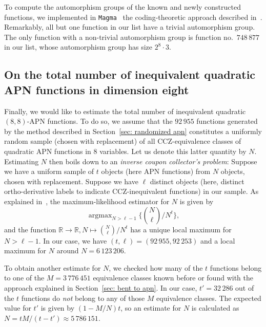 \documentclass{amsart}[11pt]
\theoremstyle{plain}
\theoremstyle{definition}
\numberwithin{theorem}{section}
\numberwithin{equation}{section}
\numberwithin{table}{section}
\numberwithin{figure}{section}
\numberwithin{algorithm}{section}
\DeclareMathOperator*{\argmax}{argmax}
\begin{document}
To compute the automorphism groups of the known and newly constructed functions, we implemented in \texttt{Magma}~\cite{MAGMA:1997} the coding-theoretic approach described in~\cite{EdelP09Equivalence}. Remarkably, all but one function in our list have a trivial automorphism group. The only function with a non-trivial automorphism group is function no.~$748\,877$ in our list, whose automorphism group has size $2^8 \cdot 3$.

\subsection{On the total number of inequivalent quadratic APN functions in dimension eight}\label{sec:total_number}
Finally, we would like to estimate the total number of inequivalent quadratic $(8,8)$-APN functions. To do so, we assume that the $92\,955$ functions generated by the method described in Section~\ref{sec: randomized apn} constitutes a uniformly random sample (chosen with replacement) of all CCZ-equivalence classes of quadratic APN functions in 8 variables. Let us denote this latter quantity by $N$. Estimating $N$ then boils down to an \emph{inverse coupon collector's problem}: Suppose we have a uniform sample of $t$ objects (here APN functions) from $N$ objects, chosen with replacement. Suppose we have $\ell$ distinct objects (here, distinct ortho-derivative labels to indicate CCZ-inequivalent functions) in our sample. As explained in~\cite{30d68731-14d3-304e-86d4-94c9bf3957ff}, the maximum-likelihood estimator for $N$ is given by $$\argmax_{N > {\ell-1}}\{\binom{N}{\ell}/N^t\},$$ and the function $\mathbb{R} \rightarrow \mathbb{R}, N \mapsto \binom{N}{\ell}/N^t$ has a unique local maximum for $N > \ell-1$. In our case, we have $(t,\ell) = (92\,955,92\,253)$ and a local maximum for $N$ around $N = 6\,123\,206$.

To obtain another estimate for $N$, we checked how many of the $t$ functions belong to one of the $M = 3\,776\,451
$ equivalence classes known before or found with the approach explained in Section~\ref{sec: bent to apn}. In our case, $t' = 32\,286$ out of the $t$ functions do \emph{not} belong to any of those $M$ equivalence classes. The expected value for $t'$ is given by $(1-M/N)t$, so an estimate for $N$ is calculated as $N = tM/(t-t') \approx 5\,786\,151$.
\end{document}
